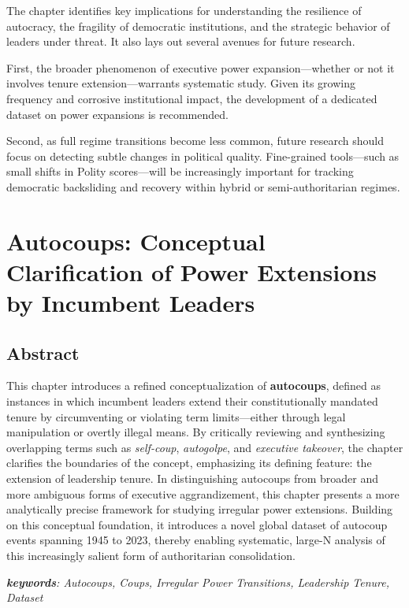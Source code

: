 \documentclass[
  12pt,
]{report}
\begin{document}
The chapter identifies key implications for understanding the resilience
of autocracy, the fragility of democratic institutions, and the
strategic behavior of leaders under threat. It also lays out several
avenues for future research.

First, the broader phenomenon of executive power expansion---whether or
not it involves tenure extension---warrants systematic study. Given its
growing frequency and corrosive institutional impact, the development of
a dedicated dataset on power expansions is recommended.

Second, as full regime transitions become less common, future research
should focus on detecting subtle changes in political quality.
Fine-grained tools---such as small shifts in Polity scores---will be
increasingly important for tracking democratic backsliding and recovery
within hybrid or semi-authoritarian regimes.

\chapter{Autocoups: Conceptual Clarification of Power Extensions by
Incumbent Leaders}\label{sec-chapter3}

\section*{Abstract}\label{abstract-1}

This chapter introduces a refined conceptualization of
\textbf{autocoups}, defined as instances in which incumbent leaders
extend their constitutionally mandated tenure by circumventing or
violating term limits---either through legal manipulation or overtly
illegal means. By critically reviewing and synthesizing overlapping
terms such as \emph{self-coup}, \emph{autogolpe}, and \emph{executive
takeover}, the chapter clarifies the boundaries of the concept,
emphasizing its defining feature: the extension of leadership tenure. In
distinguishing autocoups from broader and more ambiguous forms of
executive aggrandizement, this chapter presents a more analytically
precise framework for studying irregular power extensions. Building on
this conceptual foundation, it introduces a novel global dataset of
autocoup events spanning 1945 to 2023, thereby enabling systematic,
large-N analysis of this increasingly salient form of authoritarian
consolidation.

\emph{\textbf{keywords}: Autocoups, Coups, Irregular Power Transitions,
Leadership Tenure, Dataset}
\end{document}
